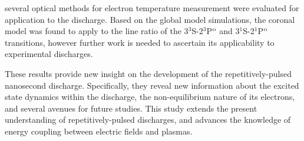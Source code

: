 \noindent several optical methods for electron temperature
measurement were evaluated for application to the discharge. Based on the global
model simulations, the coronal model was found to apply to the line ratio of the
3$^3$S-2$^3$P$^\mathrm{o}$ and 3$^1$S-2$^1$P$^\mathrm{o}$ transitions, however further work is
needed to ascertain its applicability to experimental discharges.

These results provide new insight on the development of the repetitively-pulsed
nanosecond discharge. Specifically, they reveal new information about the
excited state dynamics within the discharge, the non-equilibrium nature of its
electrons, and several avenues for future studies. This study extends the
present understanding of repetitively-pulsed discharges, and advances the
knowledge of energy coupling between electric fields and plasmas.


